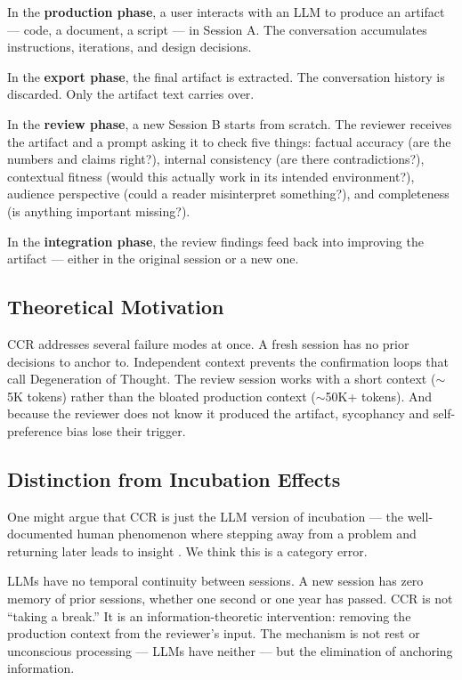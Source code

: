 \documentclass[11pt]{article}
\begin{document}
In the \textbf{production phase}, a user interacts with an LLM to produce an artifact --- code, a document, a script --- in Session A. The conversation accumulates instructions, iterations, and design decisions.

In the \textbf{export phase}, the final artifact is extracted. The conversation history is discarded. Only the artifact text carries over.

In the \textbf{review phase}, a new Session B starts from scratch. The reviewer receives the artifact and a prompt asking it to check five things: factual accuracy (are the numbers and claims right?), internal consistency (are there contradictions?), contextual fitness (would this actually work in its intended environment?), audience perspective (could a reader misinterpret something?), and completeness (is anything important missing?).

In the \textbf{integration phase}, the review findings feed back into improving the artifact --- either in the original session or a new one.

\subsection{Theoretical Motivation}

CCR addresses several failure modes at once. A fresh session has no prior decisions to anchor to. Independent context prevents the confirmation loops that \citet{liang2024encouraging} call Degeneration of Thought. The review session works with a short context ($\sim$5K tokens) rather than the bloated production context ($\sim$50K+ tokens). And because the reviewer does not know it produced the artifact, sycophancy and self-preference bias lose their trigger.

\subsection{Distinction from Incubation Effects}

One might argue that CCR is just the LLM version of incubation --- the well-documented human phenomenon where stepping away from a problem and returning later leads to insight \citep{wallas1926art}. We think this is a category error.

LLMs have no temporal continuity between sessions. A new session has zero memory of prior sessions, whether one second or one year has passed. CCR is not ``taking a break.'' It is an information-theoretic intervention: removing the production context from the reviewer's input. The mechanism is not rest or unconscious processing --- LLMs have neither --- but the elimination of anchoring information.
\end{document}
